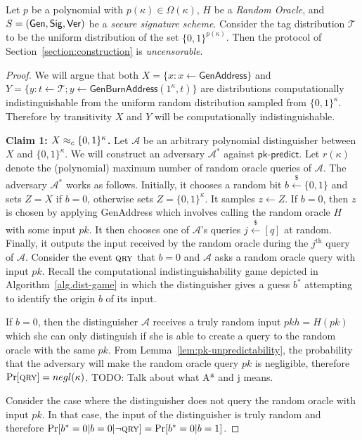 \begin{theorem}[Uncensorability]
  Let $p$ be a polynomial with $p(\kappa) \in \Omega(\kappa)$, $H$ be a \emph{Random Oracle}, and $S = (\mathsf{Gen}, \mathsf{Sig}, \mathsf{Ver})$ be a \emph{secure signature scheme}. Consider the tag distribution $\mathcal{T}$ to be the uniform distribution of the set $\{0, 1\}^{p(\kappa)}$.
  Then the protocol of Section~\ref{section:construction} is \emph{uncensorable}.
\end{theorem}
\begin{proof}
  We will argue that both
  $X = \{x: x \gets \textsf{GenAddress}\}$ and
  $Y = \{y: t \gets \mathcal{T}; y \gets \textsf{GenBurnAddress}(1^\kappa, t)\}$ are distributions computationally indistinguishable from the uniform random distribution sampled from $\{0, 1\}^\kappa$. Therefore by transitivity $X$ and $Y$ will be computationally indistinguishable.

  \textbf{Claim 1: $X \approx_c \{0, 1\}^\kappa$.}
  Let $\mathcal{A}$ be an arbitrary polynomial distinguisher between $X$ and $\{0, 1\}^\kappa$. We will construct an adversary $\mathcal{A}^*$ against $\textsf{pk-predict}$. Let $r(\kappa)$ denote the (polynomial) maximum number of random oracle queries of $\mathcal{A}$. The adversary $\mathcal{A}^*$ works as follows. Initially, it chooses a random bit $b \stackrel{\$}{\gets} \{0, 1\}$ and sets $Z = X$ if $b = 0$, otherwise sets $Z = \{0, 1\}^\kappa$.
  It samples $z \gets Z$. If $b = 0$, then $z$ is chosen by applying \textsf{GenAddress} which involves calling the random oracle $H$ with some input $pk$. It then chooses one of $\mathcal{A}$'s queries $j \stackrel{\$}{\gets} [q]$ at random. Finally, it outputs the input received by the random oracle during the $j^\text{th}$ query of $\mathcal{A}$. Consider the event $\textsc{qry}$ that $b = 0$ and $\mathcal{A}$ asks a random oracle query with input $pk$. Recall the computational indistinguishability game depicted in
  Algorithm~\ref{alg.dist-game} in which the distinguisher gives a guess $b^*$
  attempting to identify the origin $b$ of its input.

  If $b = 0$, then the distinguisher $\mathcal{A}$ receives a truly random input
  $pkh = H(pk)$ which she can only distinguish if she is able to create a query
  to the random oracle with the same $pk$. From
  Lemma~\ref{lem:pk-unpredictability}, the probability that the adversary will
  make the random oracle query $pk$ is negligible, therefore $\Pr[\textsc{qry}] =
  negl(\kappa)$.
  TODO: Talk about what A* and j means.

  Consider the case where the distinguisher does not query the random oracle
  with input $pk$. In that case, the input of the distinguisher is truly random
  and therefore $\Pr[b^* = 0|b = 0|\lnot \textsc{qry}] = \Pr[b^* = 0|b = 1]$.


\end{proof}

